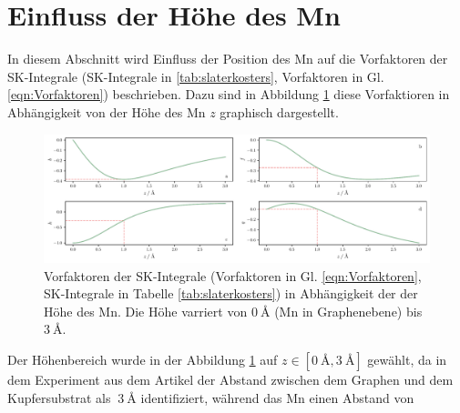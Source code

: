 \section{Einfluss der Höhe des Mn}
In diesem Abschnitt wird Einfluss der Position des Mn auf die Vorfaktoren der SK-Integrale (SK-Integrale in \ref{tab:slaterkosters}, Vorfaktoren in Gl. \eqref{eqn:Vorfaktoren}) beschrieben.
Dazu sind in Abbildung \ref{fig:Faktoreninz} diese Vorfaktioren in Abhängigkeit von der Höhe des Mn $z$ graphisch dargestellt.
\begin{figure}
    \centering
    \includegraphics[width = \textwidth]{Plots/Faktoreninz.pdf}
    \caption{Vorfaktoren der SK-Integrale (Vorfaktoren in Gl. \eqref{eqn:Vorfaktoren}, SK-Integrale in Tabelle \ref{tab:slaterkosters}) in Abhängigkeit der der Höhe des Mn.
    Die Höhe varriert von $\qty{0}{\angstrom}$ (Mn in Graphenebene) bis $\qty{3}{\angstrom}$.}
    \label{fig:Faktoreninz}
\end{figure}
Der Höhenbereich wurde in der Abbildung \ref{fig:Faktoreninz} auf $z \in [\qty{0}{\angstrom}, \qty{3}{\angstrom}]$ gewählt, da in dem Experiment aus dem Artikel \cite{doi:10.1021/acsnano.1c00139} 
der Abstand zwischen dem Graphen und dem Kupfersubstrat als $ ~ \qty{3}{\angstrom}$ identifiziert, während das Mn einen Abstand von 
